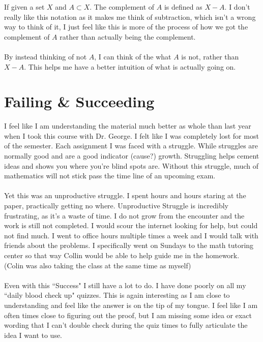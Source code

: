 \documentclass[10pt]{article}
\begin{document}
If given a set $ X $ and $ A\subset X $. The complement of $ A $ is defined as $ X-A $. I don't really like this notation as it makes me think of subtraction, which isn't a wrong way to think of it, I just feel like this is more of the process of how we got the complement of $ A $ rather than actually being the complement.\\
\\
By instead thinking of not $ A $, I can think of the what $ A $ is not, rather than $ X-A $. This helps me have a better intuition of what is actually going on.


\newpage
\section{Failing \& Succeeding}

I feel like I am understanding the material much better as whole than last year when I took this course with Dr. George. I felt like I was completely lost for most of the semester. Each assignment I was faced with a struggle. While struggles are normally good and are a good indicator (cause?) growth. Struggling helps cement ideas and shows you where you're blind spots are. Without this struggle, much of mathematics will not stick pass the time line of an upcoming exam.\\
\\
Yet this was an unproductive struggle. I spent hours and hours staring at the paper, practically getting no where. Unproductive Struggle is incredibly frustrating, as it's a waste of time. I do not grow from the encounter and the work is still not completed.  I would scour the internet looking for help, but could not find much. I went to office hours multiple times a week and I would talk with friends about the problems. I specifically went on Sundays to the math tutoring center so that way Collin would be able to help guide me in the homework. (Colin was also taking the class at the same time as myself)\\
\\
Even with this ``Success" I still have a lot to do. I have done poorly on all my ``daily blood check up" quizzes. This is again interesting as I am close to understanding and feel like the answer is on the tip of my tongue. I feel like I am often times close to figuring out the proof, but I am missing some idea or exact wording that I can't double check during the quiz times to fully articulate the idea I want to use. \\
\\
\end{document}
